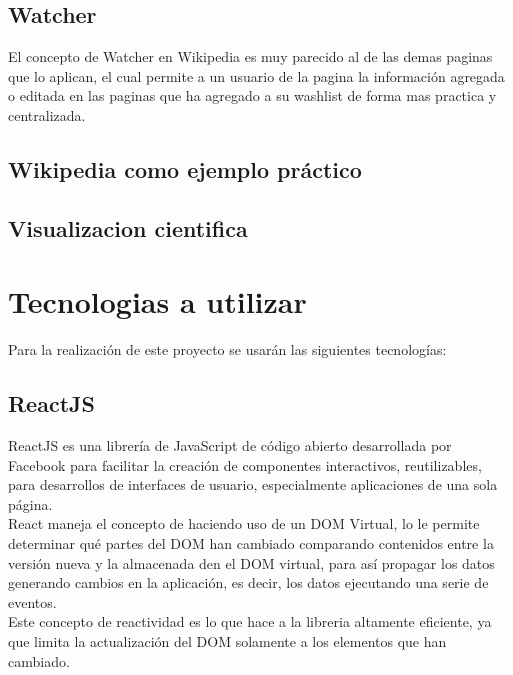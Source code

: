         
    \subsection{Watcher}

        El concepto de Watcher en Wikipedia es muy parecido al de las demas paginas que lo aplican, el cual permite a un usuario de la pagina  la información agregada o editada en las paginas que ha agregado a su washlist de forma mas practica y centralizada.
       
    \subsection{Wikipedia como ejemplo práctico}

    \subsection{Visualizacion cientifica}

    


\section{Tecnologias a utilizar}

    Para la realización de este proyecto se usarán las siguientes tecnologías:

    \subsection{ReactJS}

        ReactJS es una librería de JavaScript de código abierto desarrollada por Facebook para facilitar la creación de componentes interactivos, reutilizables, para desarrollos de interfaces de usuario, especialmente aplicaciones de una sola página.\\

        React maneja el concepto de  haciendo uso de un DOM Virtual, lo le permite determinar qué partes del DOM han cambiado comparando contenidos entre la versión nueva y la almacenada den el DOM virtual, para así propagar los datos generando cambios en la aplicación, es decir, los datos  ejecutando una serie de eventos.\\

        Este concepto de reactividad es lo que hace a la libreria altamente eficiente, ya que limita la actualización del DOM solamente a los elementos que han cambiado.\\

